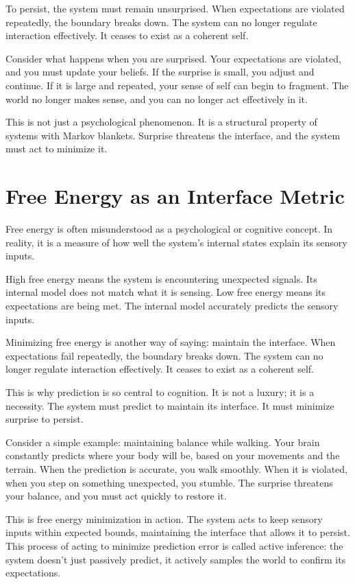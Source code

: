 \documentclass[
  openright]{book}
\begin{document}
To persist, the system must remain unsurprised. When expectations are
violated repeatedly, the boundary breaks down. The system can no longer
regulate interaction effectively. It ceases to exist as a coherent self.

Consider what happens when you are surprised. Your expectations are
violated, and you must update your beliefs. If the surprise is small,
you adjust and continue. If it is large and repeated, your sense of self
can begin to fragment. The world no longer makes sense, and you can no
longer act effectively in it.

This is not just a psychological phenomenon. It is a structural property
of systems with Markov blankets. Surprise threatens the interface, and
the system must act to minimize it.

\section{Free Energy as an Interface
Metric}\label{free-energy-as-an-interface-metric}

Free energy is often misunderstood as a psychological or cognitive
concept. In reality, it is a measure of how well the system's internal
states explain its sensory inputs.

High free energy means the system is encountering unexpected signals.
Its internal model does not match what it is sensing. Low free energy
means its expectations are being met. The internal model accurately
predicts the sensory inputs.

Minimizing free energy is another way of saying: maintain the interface.
When expectations fail repeatedly, the boundary breaks down. The system
can no longer regulate interaction effectively. It ceases to exist as a
coherent self.

This is why prediction is so central to cognition. It is not a luxury;
it is a necessity. The system must predict to maintain its interface. It
must minimize surprise to persist.

Consider a simple example: maintaining balance while walking. Your brain
constantly predicts where your body will be, based on your movements and
the terrain. When the prediction is accurate, you walk smoothly. When it
is violated, when you step on something unexpected, you stumble. The
surprise threatens your balance, and you must act quickly to restore it.

This is free energy minimization in action. The
system acts to keep sensory inputs within expected bounds, maintaining
the interface that allows it to persist. This process of acting to
minimize prediction error is called active inference: the system doesn't
just passively predict, it actively samples the world to confirm its
expectations.
\end{document}
